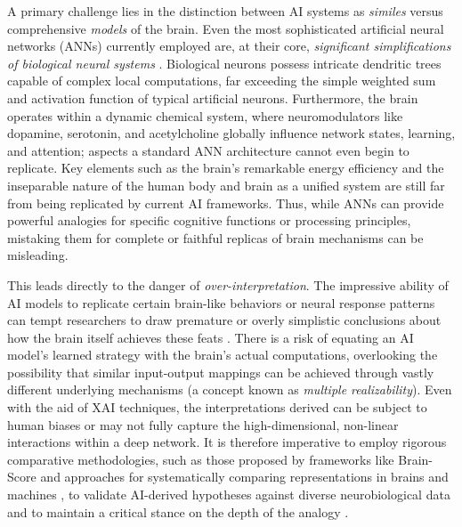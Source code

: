 A primary challenge lies in the distinction between AI systems as \textit{similes} versus comprehensive \textit{models} of the brain. Even the most sophisticated artificial neural networks (ANNs) currently employed are, at their core, \textit{significant simplifications of biological neural systems} \cite{richards2019deep}. Biological neurons possess intricate dendritic trees capable of complex local computations, far exceeding the simple weighted sum and activation function of typical artificial neurons. Furthermore, the brain operates within a dynamic chemical system, where neuromodulators like dopamine, serotonin, and acetylcholine globally influence network states, learning, and attention; aspects a standard ANN architecture cannot even begin to replicate. Key elements such as the brain's remarkable energy efficiency and the inseparable nature of the human body and brain as a unified system are still far from being replicated by current AI frameworks. Thus, while ANNs can provide powerful analogies for specific cognitive functions or processing principles, mistaking them for complete or faithful replicas of brain mechanisms can be misleading.

This leads directly to the danger of \textit{over-interpretation}. The impressive ability of AI models to replicate certain brain-like behaviors or neural response patterns can tempt researchers to draw premature or overly simplistic conclusions about how the brain itself achieves these feats \cite{kriegeskorte2018cognitive}. There is a risk of equating an AI model's learned strategy with the brain's actual computations, overlooking the possibility that similar input-output mappings can be achieved through vastly different underlying mechanisms (a concept known as \textit{multiple realizability}). Even with the aid of XAI techniques, the interpretations derived can be subject to human biases or may not fully capture the high-dimensional, non-linear interactions within a deep network. It is therefore imperative to employ rigorous comparative methodologies, such as those proposed by frameworks like Brain-Score \cite{schrimpf2020brain} and approaches for systematically comparing representations in brains and machines \cite{mcclure2024how}, to validate AI-derived hypotheses against diverse neurobiological data and to maintain a critical stance on the depth of the analogy \cite{doshi2017towards}.

